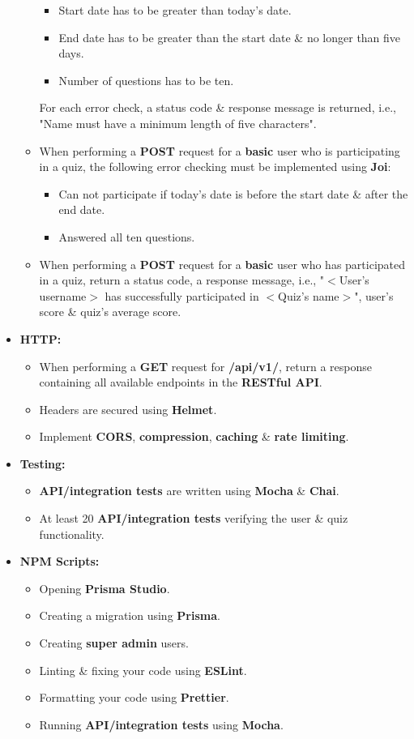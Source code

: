 \documentclass{article}
\begin{document}
\begin{itemize}
\begin{itemize}
\begin{itemize}
			\item Start date has to be greater than today's date.
			\item End date has to be greater than the start date \& no longer than five days. 
			\item Number of questions has to be ten.
		\end{itemize}
		For each error check, a status code \& response message is returned, i.e., "Name must have a minimum length of five characters".
		\item When performing a \textbf{POST} request for a \textbf{basic} user who is participating in a quiz, the following error checking must be implemented using \textbf{Joi}:
		\begin{itemize}
			\item Can not participate if today's date is before the start date \& after the end date.
			\item Answered all ten questions.
		\end{itemize}
		\item When performing a \textbf{POST} request for a \textbf{basic} user who has participated in a quiz, return a status code, a response message, i.e., "$<$User's username$>$ has successfully participated in $<$Quiz's name$>$", user's score \& quiz's average score.
	\end{itemize}
	\item \textbf{HTTP:}
	\begin{itemize}
		\item When performing a \textbf{GET} request for \textbf{/api/v1/}, return a response containing all available endpoints in the \textbf{RESTful API}. 
		\item Headers are secured using \textbf{Helmet}.
		\item Implement \textbf{CORS}, \textbf{compression}, \textbf{caching} \& \textbf{rate limiting}.
	\end{itemize}
	\item \textbf{Testing:}
	\begin{itemize}
		\item \textbf{API/integration tests} are written using \textbf{Mocha} \& \textbf{Chai}.
		\item At least 20 \textbf{API/integration tests} verifying the user \& quiz functionality.
	\end{itemize}
	\item \textbf{NPM Scripts:}
	\begin{itemize}
		\item Opening \textbf{Prisma Studio}.
		\item Creating a migration using \textbf{Prisma}. 
		\item Creating \textbf{super admin} users.
		\item Linting \& fixing your code using \textbf{ESLint}.
		\item Formatting your code using \textbf{Prettier}.
		\item Running \textbf{API/integration tests} using \textbf{Mocha}.
	\end{itemize}
\end{itemize} 
\end{document}
